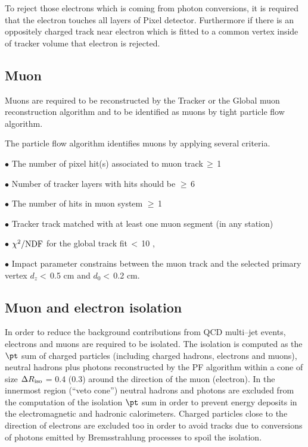 To reject those electrons which is coming from photon conversions, it is required that the electron touches all layers of Pixel detector. Furthermore if there is an oppositely charged track near electron which is fitted to a common vertex inside of tracker volume that electron is rejected.  
\subsection{Muon}
Muons are required to be reconstructed by the Tracker or the Global muon reconstruction algorithm and to be identified as 
muons by tight particle flow algorithm.

The particle flow algorithm identifies  muons by applying several criteria.

$\bullet$ The number of pixel hit(s) associated to muon track\,$\geq $\,1

$\bullet$ Number of tracker layers with hits should be $\geq $\,6

$\bullet$ The number of hits in muon system $\geq $\,1

$\bullet$ Tracker track matched with at least one muon segment (in any station)

$\bullet$ $\chi ^{2}/{\rm NDF} $ for the global track fit\,$< $\,10 ,

$\bullet$ Impact parameter constrains between the muon track and the selected primary vertex 
 $d_{z} < $\,0.5 cm and $d_{0} <$\,0.2 cm.

\subsection{Muon and electron isolation}

In order to reduce the background contributions from QCD multi–jet events, electrons and
muons are required to be isolated. The isolation is computed as the $\pt$ sum of charged particles (including charged hadrons, 
electrons and muons), neutral hadrons plus photons reconstructed by the PF algorithm within a cone of size
$\Delta R_{\rm iso}$ = 0.4 (0.3) around the direction of the muon (electron). 
In the innermost region
(``veto cone'') neutral
hadrons and photons  are excluded from the computation of the isolation $\pt$ sum in order to prevent energy deposits in the electromagnetic and hadronic calorimeters. Charged particles close to the direction of electrons  are excluded too in order to avoid tracks due to conversions of photons emitted by Bremsstrahlung processes to spoil the isolation.

